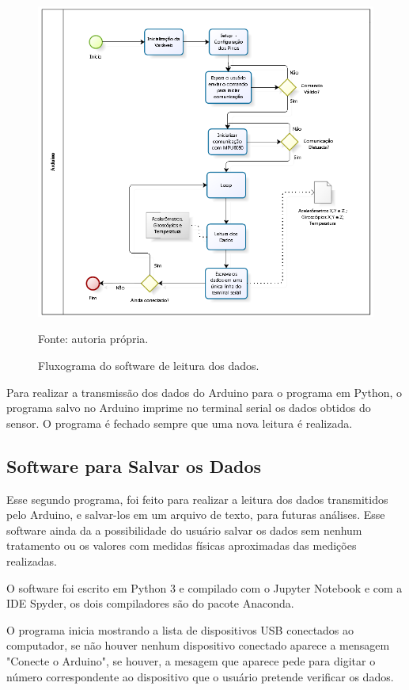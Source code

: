 		\begin{figure}[h]
			\centering
			\includegraphics[keepaspectratio=true,scale=0.9]{figuras/diagrama_embarcado.PNG}
			\caption{Fluxograma do software de leitura dos dados. }
			Fonte: autoria própria. 
			\label{fluxograma_arduino}	
		\end{figure}
		
		Para realizar a transmissão dos dados do Arduino para o programa em Python, o programa salvo no Arduino imprime no terminal serial os dados obtidos do sensor. O programa é fechado sempre que uma nova leitura é realizada.
		 
\subsection{Software para Salvar os Dados}
		Esse segundo programa, foi feito para realizar a leitura dos dados transmitidos pelo Arduino, e salvar-los em um arquivo de texto, para futuras análises. Esse software ainda da a possibilidade do usuário salvar os dados sem nenhum tratamento ou os valores com medidas físicas aproximadas das medições realizadas. 
		
		O software foi escrito em Python 3 e compilado com o Jupyter Notebook e com a IDE Spyder, os dois compiladores são do pacote Anaconda. 
		
		O programa inicia mostrando a lista de dispositivos USB conectados ao computador, se não houver nenhum dispositivo conectado aparece a mensagem "Conecte o Arduino", se houver, a mesagem que aparece pede para digitar o número correspondente ao dispositivo que o usuário pretende verificar os dados. 
		
